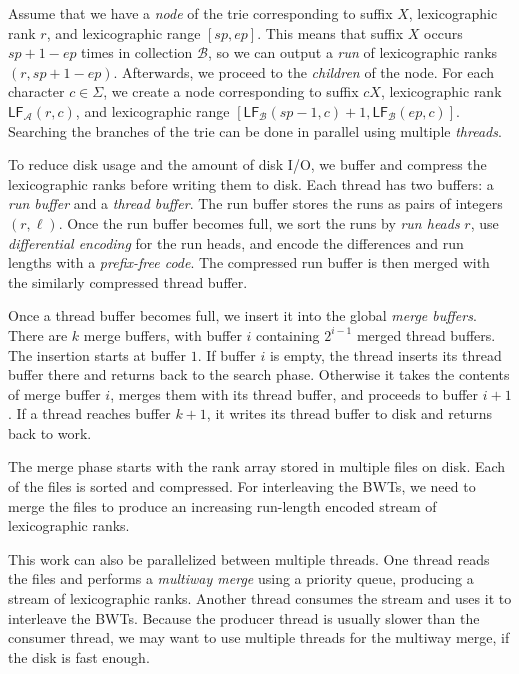 \documentclass[smallabstract,smallcaptions]{dccpaper}
\newcommand{\BWT}{\textsf{BWT}}
\newcommand{\mLF}{\ensuremath{\mathsf{LF}}}
\newcommand{\Acoll}{\ensuremath{\mathcal{A}}}
\newcommand{\Bcoll}{\ensuremath{\mathcal{B}}}
\begin{document}
Assume that we have a \emph{node} of the trie corresponding to suffix $X$, lexicographic rank $r$, and lexicographic range $[sp,ep]$. This means that suffix $X$ occurs $sp+1-ep$ times in collection $\Bcoll$, so we can output a \emph{run} of lexicographic ranks $(r, sp+1-ep)$. Afterwards, we proceed to the \emph{children} of the node. For each character $c \in \Sigma$, we create a node corresponding to suffix $cX$, lexicographic rank $\mLF_{\Acoll}(r,c)$, and lexicographic range $[\mLF_{\Bcoll}(sp-1, c) + 1, \mLF_{\Bcoll}(ep, c)]$. Searching the branches of the trie can be done in parallel using multiple \emph{threads}.


To reduce disk usage and the amount of disk I/O, we buffer and compress the lexicographic ranks before writing them to disk. Each thread has two buffers: a \emph{run buffer} and a \emph{thread buffer}. The run buffer stores the runs as pairs of integers $(r, \ell)$. Once the run buffer becomes full, we sort the runs by \emph{run heads} $r$, use \emph{differential encoding} for the run heads, and encode the differences and run lengths with a \emph{prefix-free code}. The compressed run buffer is then merged with the similarly compressed thread buffer.

Once a thread buffer becomes full, we insert it into the global \emph{merge buffers}. There are $k$ merge buffers, with buffer $i$ containing $2^{i-1}$ merged thread buffers. The insertion starts at buffer $1$. If buffer $i$ is empty, the thread inserts its thread buffer there and returns back to the search phase. Otherwise it takes the contents of merge buffer $i$, merges them with its thread buffer, and proceeds to buffer $i+1$. If a thread reaches buffer $k+1$, it writes its thread buffer to disk and returns back to work.


The merge phase starts with the rank array stored in multiple files on disk. Each of the files is sorted and compressed. For interleaving the \BWT{}s, we need to merge the files to produce an increasing run-length encoded stream of lexicographic ranks.

This work can also be parallelized between multiple threads. One thread reads the files and performs a \emph{multiway merge} using a priority queue, producing a stream of lexicographic ranks. Another thread consumes the stream and uses it to interleave the \BWT{}s. Because the producer thread is usually slower than the consumer thread, we may want to use multiple threads for the multiway merge, if the disk is fast enough.
\end{document}
